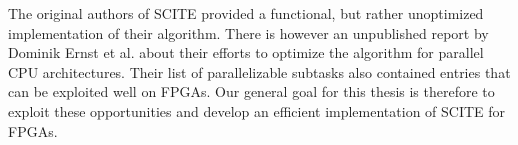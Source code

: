 The original authors of \ac{SCITE} provided a functional, but rather unoptimized implementation of their algorithm. There is however an unpublished report by Dominik Ernst et al. \cite{ernst2020Performance} about their efforts to optimize the algorithm for parallel CPU architectures. Their list of parallelizable subtasks also contained entries that can be exploited well on \acp{FPGA}. Our general goal for this thesis is therefore to exploit these opportunities and develop an efficient implementation of \ac{SCITE} for \acp{FPGA}. 



